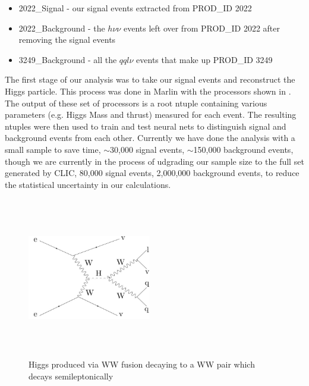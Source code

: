 \begin{itemize}
\item 2022\_Signal - our signal events extracted from PROD\_ID 2022
\item 2022\_Background - the ${h\nu\nu}$ events left over from PROD\_ID 2022 after removing the signal events
\item 3249\_Background - all the ${qql\nu}$ events that make up PROD\_ID 3249
\end{itemize}
The first stage of our analysis was to take our signal events and reconstruct the Higgs particle. This process was done in Marlin with the processors shown in . The output of these set of processors is a root ntuple containing various parameters (e.g. Higgs Mass and thrust) measured for each event. The resulting ntuples were then used to train and test neural nets to distinguish signal and background events from each other. Currently we have done the analysis with a small sample to save time, $\sim$30,000 signal events, $\sim$150,000 background events, though we are currently in the process of udgrading our sample size to the full set generated by \ac{CLIC}, 80,000 signal events, 2,000,000 background events, to reduce the statistical uncertainty in our calculations.

\begin{figure}
  \centering
  \includegraphics[width=0.48\textwidth,height=7cm,keepaspectratio]{fig/feynmann}
  \caption[Signal Feynmann Diagram]{Higgs produced via WW fusion decaying to a WW pair which decays semileptonically}
  \label{Fig:feynmann}
\end{figure}


